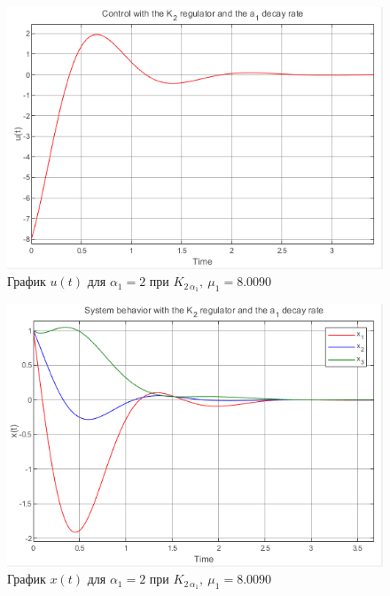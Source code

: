 \documentclass[a4paper, 12pt]{article}
\begin{document}
    \begin{figure}[H]
        \centering
        \includegraphics{1task_K2a1_u.png}
        \captionsetup{skip=0pt}
        \caption{График $u(t)$ для $\alpha_1=2$ при $K_{2\,\alpha_1},\ \mu_1=8.0090$}
        \label{fig:1task_K2a1_u}
    \end{figure}
    \begin{figure}[H]
        \centering
        \includegraphics{1task_K2a1_x.png}
        \captionsetup{skip=0pt}
        \caption{График $x(t)$ для $\alpha_1=2$ при $K_{2\,\alpha_1},\ \mu_1=8.0090$}
        \label{fig:1task_K2a1_x}
    \end{figure}
    \newpage
    \vspace*{0.01mm}
\end{document}
